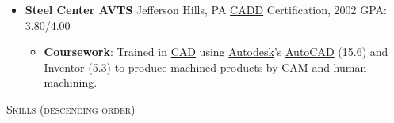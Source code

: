 \documentclass{article}
\newcommand{\lineunder}{\vspace*{-8pt} \\ \hspace*{-18pt} \hrulefill \\}
\newcommand{\header}[1]{{\hspace*{-15pt}\vspace*{6pt} \textsc{#1}} \vspace*{-6pt} \lineunder}
\newenvironment{achievements}{\begin{list}{$\bullet$}{\topsep 0pt \itemsep -2pt}}{\vspace*{4pt}\end{list}}
\begin{document}
\begin{itemize}[leftmargin=*]
  \item \textbf{Steel Center AVTS} Jefferson Hills, PA \href{http://en.wikipedia.org/wiki/Computer-aided_design}{CADD} Certification, 2002 GPA: 3.80/4.00
  \begin{itemize}
    \item \textbf{Coursework}: Trained in \href{http://en.wikipedia.org/wiki/Computer-aided_design}{CAD} using \href{http://www.autodesk.com/}{Autodesk}'s \href{http://www.autodesk.com/  products/autocad/overview}{AutoCAD} (15.6) and \href{http://www.autodesk.com/products/autodesk-inventor-family/overview}{Inventor} (5.3) to produce machined products by \href{http://en.wikipedia.org/wiki/Computer-aided_manufacturing}{CAM} and human machining.  
  \end{itemize}

\end{itemize}

\header{Skills (descending order)}

\end{document}
